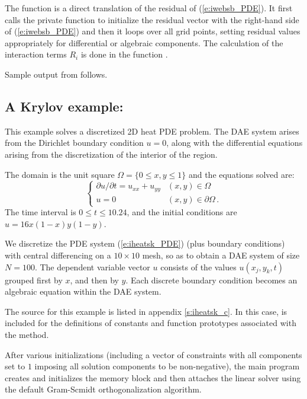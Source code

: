 The function  is a direct translation of the residual of
(\ref{e:iwebsb_PDE}).  It first calls the private function  to
initialize the residual vector with the right-hand side of (\ref{e:iwebsb_PDE})
and then it loops over all grid points, setting residual values appropriately for 
differential or algebraic components. The calculation of the interaction terms
$R_i$ is done in the function .


Sample output from  follows.


\subsection{A Krylov example: }\label{ss:iheatsk}

This example solves a discretized 2D heat PDE problem. The DAE system
arises from the Dirichlet boundary condition $u = 0$, along with the 
differential equations arising from the discretization of the interior 
of the region. 

The domain is the unit square $\Omega = \{ 0 \le x,y \le 1 \}$ and the
equations solved are:
\begin{equation}\label{e:iheatsk_PDE}
\begin{cases}
  \partial u / \partial t = u_{xx} + u_{yy}  & (x,y) \in \Omega \\
  u = 0 & (x,y) \in \partial\Omega\, .
\end{cases}
\end{equation}
The time interval is $0 \leq t \leq 10.24$, and the initial conditions are 
$u = 16x(1-x)y(1-y)$.

We discretize the PDE system (\ref{e:iheatsk_PDE}) (plus boundary conditions)
with central differencing on a $10 \times 10$ mesh, so as to obtain a
DAE system of size $N = 100$.  The dependent variable vector $u$
consists of the values $u(x_j,y_k,t)$ grouped first by $x$, and then
by $y$.  Each discrete boundary condition becomes an algebraic equation
within the DAE system.

The source for this example is listed in appendix \ref{s:iheatsk_c}.
In this case,  is included for the definitions of
constants and function prototypes associated with the {\spgmr} method.

After various initializations (including a vector of constraints with
all components set to $1$ imposing all solution components to be
non-negative), the main program creates and initializes the {\ida}
memory block and then attaches the {\idaspgmr} linear solver using the
default  Gram-Scmidt orthogonalization algorithm.

